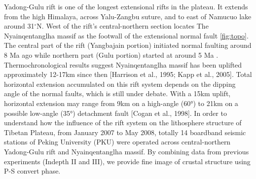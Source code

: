 Yadong-Gulu rift is one of the longest extensional rifts in the plateau. It extends from the high Himalaya, across Yalu-Zangbu suture, and to east of Namucuo lake around 31$^\circ$N. West of the rift's central-northern section locates The Nyainqentanglha massif as the footwall of the extensional normal fault \ref{fig:topo}. 
The central part of the rift (Yangbajain portion) initiated normal faulting around 8 Ma ago while northern part (Gulu portion) started at around 5 Ma \cite{Harrison_1995}\cite{stockli2002late}. Thermochronological results suggest Nyainqentanglha massif has been uplifted approximately 12-17km since then [Harrison et al., 1995; Kapp et al., 2005]. Total horizontal extension accumulated on this rift system depends on the dipping angle of the normal faults, which is still under debate. With a 15km uplift, horizontal extension may range from 9km on a high-angle (60°) to 21km on a possible low-angle (35°) detachment fault [Cogan et al., 1998]. 
In order to understand how the influence of the rift system on the lithosphere structure of Tibetan Plateau, from January 2007 to May 2008, totally 14 boardband seismic stations of Peking University (PKU) were operated across central-northern Yadong-Gulu rift and Nyainqentanglha massif. By combining data from previous experiments (Indepth II and III), we provide fine image of crustal structure using P-S convert phase.

